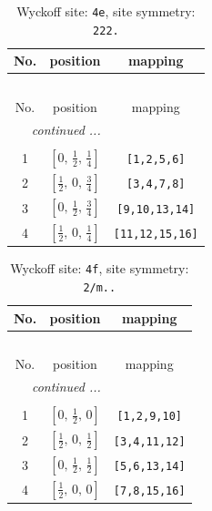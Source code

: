 \documentclass[fleqn,8pt]{jsarticle}
\begin{document}
\begin{longtable}{ccc}
\caption{Wyckoff site: {\tt 4e}, site symmetry: {\tt 222.}}
 \\
 \hline \hline
No. & position & mapping \\ \hline \endfirsthead

\multicolumn{2}{l}{\tablename\ \thetable{}} \\
 \hline \hline
No. & position & mapping \\ \hline \endhead

 \hline \hline
\multicolumn{2}{r}{\footnotesize\it continued ...} \\ \endfoot

 \hline \hline
\multicolumn{2}{r}{} \\ \endlastfoot

1 & $\left[ 0,\, \frac{1}{2},\, \frac{1}{4} \right]$ & {\tt [1,2,5,6]} \\ \hline
2 & $\left[ \frac{1}{2},\, 0,\, \frac{3}{4} \right]$ & {\tt [3,4,7,8]} \\ \hline
3 & $\left[ 0,\, \frac{1}{2},\, \frac{3}{4} \right]$ & {\tt [9,10,13,14]} \\ \hline
4 & $\left[ \frac{1}{2},\, 0,\, \frac{1}{4} \right]$ & {\tt [11,12,15,16]} \\
\end{longtable}
\renewcommand{\arraystretch}{1.2}
\begin{longtable}{ccc}
\caption{Wyckoff site: {\tt 4f}, site symmetry: {\tt 2/m..}}
 \\
 \hline \hline
No. & position & mapping \\ \hline \endfirsthead

\multicolumn{2}{l}{\tablename\ \thetable{}} \\
 \hline \hline
No. & position & mapping \\ \hline \endhead

 \hline \hline
\multicolumn{2}{r}{\footnotesize\it continued ...} \\ \endfoot

 \hline \hline
\multicolumn{2}{r}{} \\ \endlastfoot

1 & $\left[ 0,\, \frac{1}{2},\, 0 \right]$ & {\tt [1,2,9,10]} \\ \hline
2 & $\left[ \frac{1}{2},\, 0,\, \frac{1}{2} \right]$ & {\tt [3,4,11,12]} \\ \hline
3 & $\left[ 0,\, \frac{1}{2},\, \frac{1}{2} \right]$ & {\tt [5,6,13,14]} \\ \hline
4 & $\left[ \frac{1}{2},\, 0,\, 0 \right]$ & {\tt [7,8,15,16]} \\
\end{longtable}
\end{document}
